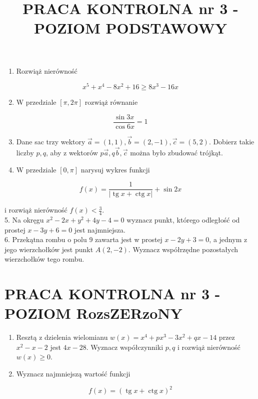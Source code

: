 \documentclass[10pt]{article}
\title{PRACA KONTROLNA nr 3 - POZIOM PODSTAWOWY }
\author{}
\date{}
\begin{document}
\maketitle
\begin{enumerate}
  \item Rozwiąż nierówność
\end{enumerate}

$$
x^{5}+x^{4}-8 x^{2}+16 \geqslant 8 x^{3}-16 x
$$

\begin{enumerate}
  \setcounter{enumi}{1}
  \item W przedziale $[\pi, 2 \pi]$ rozwiąż równanie
\end{enumerate}

$$
\frac{\sin 3 x}{\cos 6 x}=1
$$

\begin{enumerate}
  \setcounter{enumi}{2}
  \item Dane sac trzy wektory $\vec{a}=(1,1), \vec{b}=(2,-1), \vec{c}=(5,2)$. Dobierz takie liczby $p, q$, aby z wektorów $p \vec{a}, q \vec{b}, \vec{c}$ można było zbudować trójkąt.
  \item W przedziale $[0, \pi]$ narysuj wykres funkcji
\end{enumerate}

$$
f(x)=\frac{1}{|\operatorname{tg} x+\operatorname{ctg} x|}+\sin 2 x
$$

i rozwiąż nierówność $f(x)<\frac{3}{4}$.\\
5. Na okręgu $x^{2}-2 x+y^{2}+4 y-4=0$ wyznacz punkt, którego odległość od prostej $x-3 y+6=0$ jest najmniejsza.\\
6. Przekątna rombu o polu 9 zawarta jest w prostej $x-2 y+3=0$, a jednym z jego wierzchołków jest punkt $A(2,-2)$. Wyznacz współrzędne pozostałych wierzchołków tego rombu.

\section*{PRACA KONTROLNA nr 3 - POZIOM RozsZERzoNY}
\begin{enumerate}
  \item Resztą z dzielenia wielomianu $w(x)=x^{4}+p x^{3}-3 x^{2}+q x-14$ przez $x^{2}-x-2$ jest $4 x-28$. Wyznacz współczynniki $p, q$ i rozwiąż nierówność $w(x) \geqslant 0$.
  \item Wyznacz najmniejszą wartość funkcji
\end{enumerate}

$$
f(x)=(\operatorname{tg} x+\operatorname{ctg} x)^{2}
$$
\end{document}
